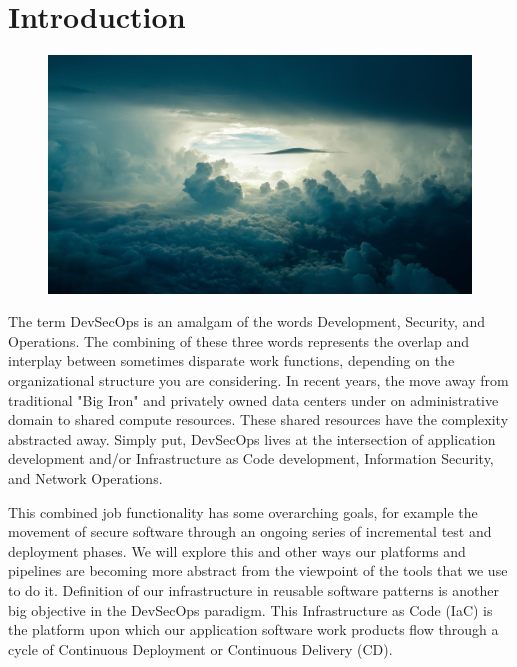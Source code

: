 \chapter{Introduction}
\begin{figure}[htb]
	\includegraphics{../images/sky-690293_1920.jpg}
	\label{fig:sky}
\end{figure}

\justify
The term DevSecOps is an amalgam of the words
Development, Security, and Operations. The combining of these three words
represents the overlap and interplay between sometimes disparate work
functions, depending on the organizational structure you are considering.
In recent years, the move away from traditional "Big Iron" and privately owned data
centers under on administrative domain to shared compute resources. These shared
resources have the complexity abstracted away.
Simply put, DevSecOps lives at the intersection of
application development and/or Infrastructure as Code
development, Information Security, and Network Operations.

\justify
This combined job functionality has some overarching goals, for example the movement of secure
software through an ongoing series of incremental test and deployment
phases. We will explore this and other ways our platforms and pipelines
are becoming more abstract from the viewpoint of the tools that we use to do it.
Definition of our infrastructure in reusable software patterns is another big objective
in the DevSecOps paradigm. This Infrastructure as Code (IaC)
is the platform
upon which our application software work products flow through a cycle of Continuous
Deployment or Continuous Delivery (CD).

